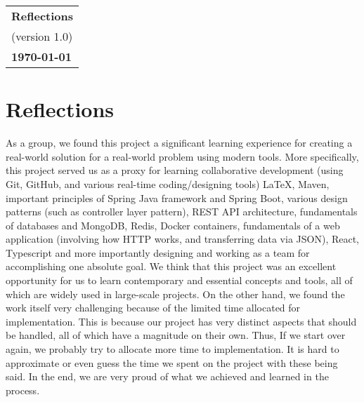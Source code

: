 \documentclass[a4paper, 12pt]{article}
\begin{document}
\begin{table}[h!]
    \renewcommand{\arraystretch}{1.5}
    \centering
    \begin{tabular}{ |>{\centering\arraybackslash}m{15.15cm}| }
        \hline
        \Large \textbf{Reflections} \\
        \small (version 1.0)        \\
        \small \textbf{\today}      \\
        \hline
    \end{tabular}
\end{table}


\section{Reflections}

As a group, we found this project a significant learning experience for creating a real-world solution for a real-world problem using 
modern tools. More specifically, this project served us as a proxy for learning collaborative development (using Git, GitHub, and 
various real-time coding/designing tools) LaTeX, Maven, important principles of Spring Java framework and Spring Boot, various design 
patterns (such as controller layer pattern), REST API architecture, fundamentals of databases and MongoDB, Redis, Docker containers, 
fundamentals of a web application (involving how HTTP works, and transferring data via JSON), React, Typescript and more importantly 
designing and working as a team for accomplishing one absolute goal. We think that this project was an excellent opportunity for us 
to learn contemporary and essential concepts and tools, all of which are widely used in large-scale projects. On the other hand, we 
found the work itself very challenging because of the limited time allocated for implementation. This is because our project has 
very distinct aspects that should be handled, all of which have a magnitude on their own. Thus, If we start over again, we 
probably try to allocate more time to implementation. It is hard to approximate or even guess the time we spent on the project 
with these being said. In the end, we are very proud of what we achieved and learned in the process.
\end{document}
